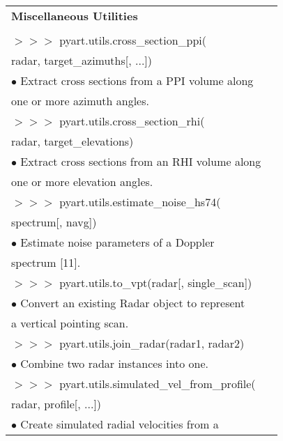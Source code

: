 \documentclass[potrait,a0paper,fontscale=0.33]{baposter} %
\begin{document}
\begin{poster}
{\begin{flushleft}
\begin{tabular}{@{}ll@{}}
\\
\multicolumn{2}{l}{\cellcolor[HTML]{DDFFFF}\bf Miscellaneous Utilities} \\
\\
$>$$>$$>$ pyart.utils.cross\_section\_ppi(\\
\-\hspace{1.5cm} radar, target\_azimuths[, ...])\\
\-\hspace{0.4cm} $\bullet$ Extract cross sections from a PPI volume along\\
\-\hspace{0.7cm} one or more azimuth angles.\\
$>$$>$$>$ pyart.utils.cross\_section\_rhi(\\
\-\hspace{1.5cm} radar, target\_elevations)\\
\-\hspace{0.4cm} $\bullet$ 	Extract cross sections from an RHI volume along\\
\-\hspace{0.7cm} one or more elevation angles.\\
$>$$>$$>$ pyart.utils.estimate\_noise\_hs74(\\
\-\hspace{1.5cm} spectrum[, navg])\\
\-\hspace{0.4cm} $\bullet$ Estimate noise parameters of a Doppler\\
\-\hspace{0.7cm} spectrum [11].\\
$>$$>$$>$ pyart.utils.to\_vpt(radar[, single\_scan])\\
\-\hspace{0.4cm} $\bullet$ Convert an existing Radar object to represent\\
\-\hspace{0.7cm} a vertical pointing scan.\\
$>$$>$$>$ pyart.utils.join\_radar(radar1, radar2)\\
\-\hspace{0.4cm} $\bullet$ Combine two radar instances into one.\\
$>$$>$$>$ pyart.utils.simulated\_vel\_from\_profile(\\
\-\hspace{1.5cm} radar, profile[, ...])\\
\-\hspace{0.4cm} $\bullet$ Create simulated radial velocities from a\\

\end{tabular}
\end{flushleft}}
\end{poster}
\end{document}
